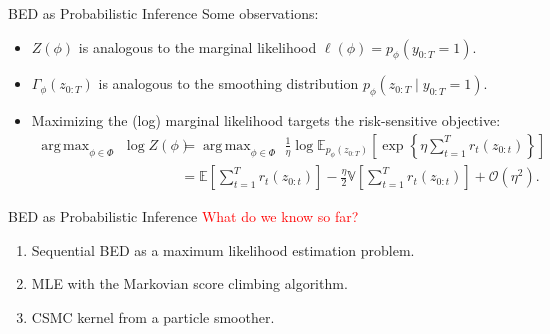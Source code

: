 \documentclass[10pt, aspectratio=1610]{beamer}
\DeclareMathOperator*{\argmax}{arg\,max}
\begin{document}
    \begin{frame}{BED as Probabilistic Inference}
      Some observations:\vspace{0.1cm}
      \begin{itemize}
        \setlength\itemsep{1em}
        \item $Z(\phi)$ is analogous to the marginal likelihood $\ell(\phi) = p_\phi(y_{0:T} = 1)$.
        \item $\Gamma_\phi(z_{0:T})$ is analogous to the smoothing distribution $p_\phi(z_{0:T} \mid y_{0:T} = 1)$.
        \item Maximizing the (log) marginal likelihood targets the risk-sensitive objective:
          \begin{align}
            \argmax_{\phi \in \Phi} \,\, \log Z(\phi) &= \argmax_{\phi \in \Phi} \,\, \frac{1}{\eta} \log \mathbb{E}_{p_\phi(z_{0:T})} \left[\exp \left\{\eta \sum_{t=1}^T r_t(z_{0:t})\right\}\right] \\
            &= \mathbb{E} \left[\sum_{t=1}^T r_t(z_{0:t})\right] - \frac{\eta}{2} \mathbb{V} \left[ \sum_{t=1}^T r_t(z_{0:t}) \right] + \mathcal{O}(\eta^2).
          \end{align}
      \end{itemize}
    \end{frame}

    \begin{frame}{BED as Probabilistic Inference}
      \textcolor{red}{\large What do we know so far?}\vspace{0.2cm}
      \begin{enumerate}
        \setlength\itemsep{1.5em}
        \item<2-> Sequential BED as a maximum likelihood estimation problem.
        \item<3-> MLE with the Markovian score climbing algorithm.
        \item<4-> CSMC kernel from a particle smoother.
      \end{enumerate}

      \vspace{0.3cm}
    \end{frame}
\end{document}
